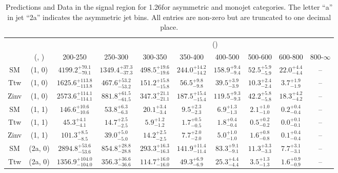 \begin{table}[h!]
\tiny
\centering
\caption{Predictions and Data in the signal region for 1.26\ifb for asymmetric and monojet categories. The letter ``a'' in jet \eg ``2a''  indicates the asymmetric jet bins. All entries are non-zero but are truncated to one decimal place.\label{tab:yieldsnodatapost_sig_comb_asym}}
\begin{tabular}
{cccccccccc}
	\hline\hline
&	&	& \multicolumn{8}{c}{\scalht (\gev)}\\ 
	&	 (\njet, \nb) & 200-250 & 250-300 & 300-350 & 350-400 & 400-500 & 500-600 & 600-800 & 800-$\infty$ \\ [0.8ex] 
\hline
	SM & (1, 0) & $4199.2^{+ 70.1 }_{- 70.1 }$ & $1349.4^{+ 37.3 }_{- 37.3 }$ & $498.5^{+ 19.6 }_{- 19.6 }$ & $244.0^{+ 14.2 }_{- 14.2 }$ & $158.9^{+ 9.4 }_{- 9.4 }$ & $52.5^{+ 5.9 }_{- 5.9 }$ & $22.0^{+ 4.4 }_{- 4.4 }$ & -- \\[0.5ex] 
	Ttw & (1, 0) & $1625.6^{+ 113.8 }_{- 113.8 }$ & $467.6^{+ 53.2 }_{- 53.2 }$ & $151.2^{+ 15.8 }_{- 15.8 }$ & $56.5^{+ 9.8 }_{- 9.8 }$ & $39.5^{+ 3.9 }_{- 3.9 }$ & $10.3^{+ 2.4 }_{- 2.4 }$ & $3.7^{+ 1.9 }_{- 1.9 }$ & -- \\[0.5ex] 
	Zinv & (1, 0) & $2573.6^{+ 114.1 }_{- 114.1 }$ & $881.8^{+ 61.5 }_{- 61.5 }$ & $347.3^{+ 21.1 }_{- 21.1 }$ & $187.5^{+ 15.4 }_{- 15.4 }$ & $119.5^{+ 9.3 }_{- 9.3 }$ & $42.2^{+ 5.8 }_{- 5.8 }$ & $18.3^{+ 4.2 }_{- 4.2 }$ & -- \\[0.5ex] 
	SM & (1, 1) & $146.6^{+ 10.6 }_{- 10.6 }$ & $53.8^{+ 6.3 }_{- 6.3 }$ & $20.1^{+ 3.4 }_{- 3.4 }$ & $9.5^{+ 2.3 }_{- 2.3 }$ & $6.9^{+ 1.3 }_{- 1.3 }$ & $2.1^{+ 1.0 }_{- 1.0 }$ & $0.2^{+ 0.4 }_{- 0.4 }$ & -- \\[0.5ex] 
	Ttw & (1, 1) & $45.3^{+ 4.1 }_{- 4.1 }$ & $14.7^{+ 2.5 }_{- 2.5 }$ & $5.9^{+ 1.2 }_{- 1.2 }$ & $1.7^{+ 0.5 }_{- 0.5 }$ & $1.8^{+ 0.4 }_{- 0.4 }$ & $0.5^{+ 0.2 }_{- 0.2 }$ & $0.0^{+ 0.1 }_{- 0.1 }$ & -- \\[0.5ex] 
	Zinv & (1, 1) & $101.3^{+ 8.5 }_{- 8.5 }$ & $39.0^{+ 5.0 }_{- 5.0 }$ & $14.2^{+ 2.5 }_{- 2.5 }$ & $7.7^{+ 2.0 }_{- 2.0 }$ & $5.0^{+ 1.0 }_{- 1.0 }$ & $1.6^{+ 0.8 }_{- 0.8 }$ & $0.1^{+ 0.4 }_{- 0.4 }$ & -- \\[0.5ex] 
	SM & (2a, 0) & $2894.8^{+ 53.6 }_{- 53.6 }$ & $854.8^{+ 28.8 }_{- 28.8 }$ & $293.3^{+ 16.3 }_{- 16.3 }$ & $141.9^{+ 11.4 }_{- 11.4 }$ & $83.3^{+ 9.1 }_{- 9.1 }$ & $11.3^{+ 3.3 }_{- 3.3 }$ & $7.7^{+ 3.1 }_{- 3.1 }$ & -- \\[0.5ex] 
	Ttw & (2a, 0) & $1356.9^{+ 104.0 }_{- 104.0 }$ & $356.3^{+ 36.6 }_{- 36.6 }$ & $114.7^{+ 16.0 }_{- 16.0 }$ & $49.3^{+ 6.9 }_{- 6.9 }$ & $25.3^{+ 4.4 }_{- 4.4 }$ & $3.5^{+ 1.3 }_{- 1.3 }$ & $1.6^{+ 0.9 }_{- 0.9 }$ & -- \\[0.5ex] 

\end{tabular}
\end{table}
